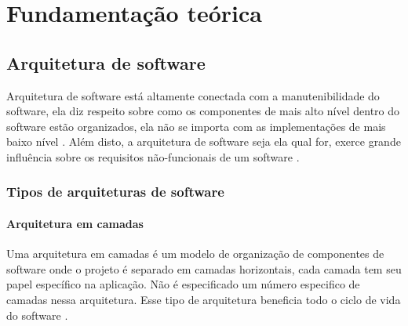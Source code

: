 \chapter{Fundamentação teórica}

\section{Arquitetura de software}
    \par Arquitetura de software está altamente conectada com a manutenibilidade do software, ela diz respeito sobre como os componentes de mais alto nível dentro do software estão organizados, ela não se importa com as implementações de mais baixo nível \cite{artigo:dantas:2021}. Além disto, a arquitetura de software seja ela qual for, exerce grande influência sobre os requisitos não-funcionais de um software \cite{artigo:lopes:2021}.
    
    \subsection{Tipos de arquiteturas de software}
        \subsubsection{Arquitetura em camadas}
            \par Uma arquitetura em camadas é um modelo de organização de componentes de software onde o projeto é separado em camadas horizontais, cada camada tem seu papel específico na aplicação. Não é especificado um número especifico de camadas nessa arquitetura. Esse tipo de arquitetura beneficia todo o ciclo de vida do software \cite{artigo:bueno:2021}.
